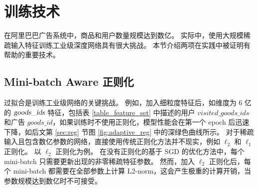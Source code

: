 \section{训练技术}
在阿里巴巴广告系统中，商品和用户数量规模达到数亿。
实际中，使用大规模稀疏输入特征训练工业级深度网络具有很大挑战。
本节介绍两项在实践中被证明有帮助的重要技术。

\subsection{Mini-batch Aware 正则化}


过拟合是训练工业级网络的关键挑战。
例如，加入细粒度特征后，如维度为 6 亿的 $\textsl{goods\_ids}$ 特征，包括表 \ref{table_feature_set} 中描述的用户 $visited\_goods\_ids$ 和广告 $goods\_id$，如果训练时不使用正则化，模型性能会在第一个 epoch 后迅速下降，如后文第 \ref{sec:reg} 节图 \ref{fig:adaptive_reg} 中的深绿色曲线所示。
对于稀疏输入且包含数亿参数的网络，直接使用传统正则化方法并不现实，例如 $\ell_2$ 和 $\ell_1$ 正则化。
以 $\ell_2$ 正则化为例。
在没有正则化的基于 SGD 的优化方法中，每个 mini-batch 只需要更新出现的非零稀疏特征参数。
然而，加入 $\ell_2$ 正则化后，每个 mini-batch 都需要在全部参数上计算 L2-norm，这会产生极重的计算开销，当参数规模达到数亿时不可接受。

